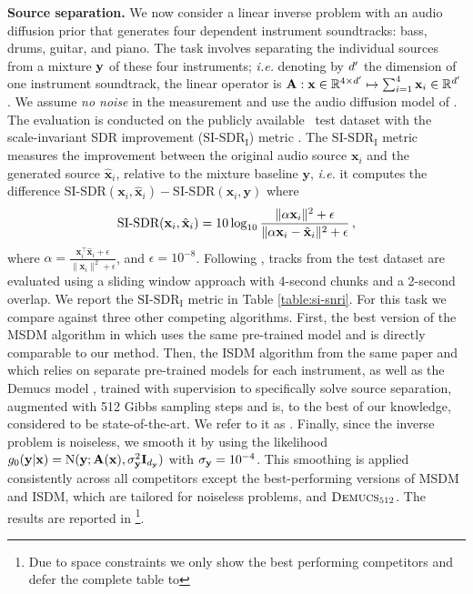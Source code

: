 \textbf{Source separation.} 
We now consider a linear inverse problem with an audio diffusion prior that generates four dependent instrument soundtracks: bass, drums, guitar, and piano. The task involves separating the individual sources from a mixture ${\mathbf{y}}$ of these four instruments; \emph{i.e.} denoting by ${d}^\prime$ the dimension of one instrument soundtrack, the linear operator is $\mathbf{A}: \mathbf{x} \in \mathbb{R}^{4 \times {d}^\prime} \mapsto \sum_{i = 1}^4 \mathbf{x}_i \in \mathbb{R}^{{d}^\prime}$. We assume \emph{no noise} in the measurement and use the audio diffusion model of \citet{mariani2023multi}. The evaluation is conducted on the publicly available \slakh\ test dataset \cite{Manilow2019slakh} with the scale-invariant SDR improvement ($\text{SI-SDR}_\text{I}$) metric \cite{le2019sdr}. The $\text{SI-SDR}_\text{I}$ metric measures the improvement between the original audio source $\mathbf{x}_i$ and the generated source $\hat{\mathbf{x}}_i$, relative to the mixture baseline $\mathbf{y}$, \emph{i.e.} it computes the difference $\text{SI-SDR}(\mathbf{x}_i, \hat{\mathbf{x}}_i) - \text{SI-SDR}(\mathbf{x}_i, \mathbf{y})$ where 
\[
\text{SI-SDR}(\mathbf{x}_i, \hat{\mathbf{x}}_i) = 10 \log_{10} \frac{\| \alpha \mathbf{x}_i \|^2 + \epsilon}{\| \alpha \mathbf{x}_i - \hat{\mathbf{x}}_i \|^2 + \epsilon} \,,
\] where $\alpha = \frac{\mathbf{x}_i ^\top \hat{\mathbf{x}}_i  + \epsilon}{\| \mathbf{x}_i \|^2 + \epsilon}$, and $\epsilon = 10^{-8}$. Following \citet[Section 5.2]{mariani2023multi}, tracks from the test dataset are evaluated using a sliding window approach with 4-second chunks and a 2-second overlap. We report the $\text{SI-SDR}_\text{I}$ metric in Table \ref{table:si-snri}. 
For this task we compare against three other competing algorithms. First, the best version of the MSDM algorithm in \cite{mariani2023multi} which uses the same pre-trained model and is directly comparable to our method. Then, the ISDM algorithm from the same paper and which relies on separate pre-trained models for each instrument, as well as the Demucs model \cite{defossez2019music}, trained with supervision to specifically solve source separation, augmented with 512 Gibbs sampling steps \cite{manilow2022improving} and is, to the best of our knowledge, considered to be state-of-the-art. We refer to it as \demucs. Finally, since the inverse problem is noiseless, we smooth it by using the likelihood $\pot{0}{\bx} = \normpdf(\obs; \bfA(\bx), \std^2 _\obs \Id_\dimobs)$ with $\sigma_{\mathbf{y}} = 10^{-4}$. This smoothing is applied consistently across all competitors except the best-performing versions of MSDM and ISDM, which are tailored for noiseless problems, and \({\textsc{{Demucs}\textsubscript{512}}}\). The results are reported in  \footnote{Due to space constraints we only show the best performing competitors and defer the complete table to }. 

